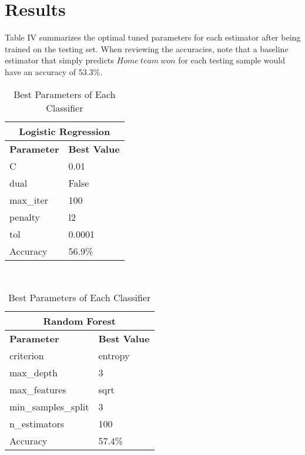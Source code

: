 \documentclass[letterpaper, 10 pt, conference]{ieeeconf}
\begin{document}
\section{Results}

Table IV summarizes the optimal tuned parameters for each estimator after being trained on the testing set. When reviewing the accuracies, note that a baseline estimator that simply predicts $Home\ team\ won$ for each testing sample would have an accuracy of 53.3\%.

\begin{table}[h]
\caption{Best Parameters of Each Classifier}
\centering
\begin{tabular}{@{}ll@{}}
\multicolumn{2}{c}{\textbf{Logistic Regression}} \\ \toprule
\textbf{Parameter}     & \textbf{Best Value}     \\ \midrule
C                      & 0.01                    \\
dual                   & False                   \\
max\_iter              & 100                     \\
penalty                & l2                      \\
tol                    & 0.0001                  \\\midrule
Accuracy & 56.9\% \\\bottomrule
\end{tabular}\\\medskip
\begin{tabular}{@{}ll@{}}

\multicolumn{2}{c}{\textbf{Random Forest}}                                       \\ \toprule
\textbf{Parameter} & \textbf{Best Value} \\\midrule
criterion                              & entropy                                 \\
max\_depth                             & 3                                       \\
max\_features                          & sqrt                                    \\
min\_samples\_split                    & 3                                       \\
n\_estimators                          & 100                                     \\ \midrule
Accuracy & 57.4\% \\\bottomrule
\end{tabular}
\end{table}
\end{document}
